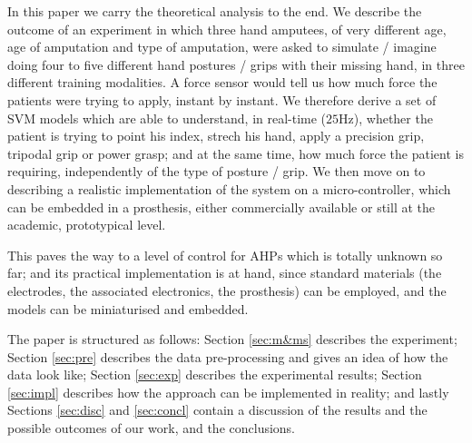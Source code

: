 In this paper we carry the theoretical analysis to the end. We
describe the outcome of an experiment in which three hand amputees, of
very different age, age of amputation and type of amputation, were
asked to simulate / imagine doing four to five different hand postures
/ grips with their missing hand, in three different training
modalities. A force sensor would tell us how much force the patients
were trying to apply, instant by instant. We therefore derive a set of
SVM models which are able to understand, in real-time ($25$Hz),
whether the patient is trying to point his index, strech his hand,
apply a precision grip, tripodal grip or power grasp; and at the same
time, how much force the patient is requiring, independently of the
type of posture / grip. We then move on to describing a realistic
implementation of the system on a micro-controller, which can be
embedded in a prosthesis, either commercially available or still at
the academic, prototypical level.

This paves the way to a level of control for AHPs which is totally
unknown so far; and its practical implementation is at hand, since
standard materials (the electrodes, the associated electronics, the
prosthesis) can be employed, and the models can be miniaturised and
embedded.

The paper is structured as follows: Section \ref{sec:m&ms} describes
the experiment; Section \ref{sec:pre} describes the data
pre-processing and gives an idea of how the data look like; Section
\ref{sec:exp} describes the experimental results; Section
\ref{sec:impl} describes how the approach can be implemented in
reality; and lastly Sections \ref{sec:disc} and \ref{sec:concl}
contain a discussion of the results and the possible outcomes of our
work, and the conclusions.
